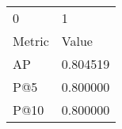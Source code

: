\begin{tabular}{ll}
0 & 1 \\
Metric & Value \\
AP & 0.804519 \\
P@5 & 0.800000 \\
P@10 & 0.800000 \\
\end{tabular}
